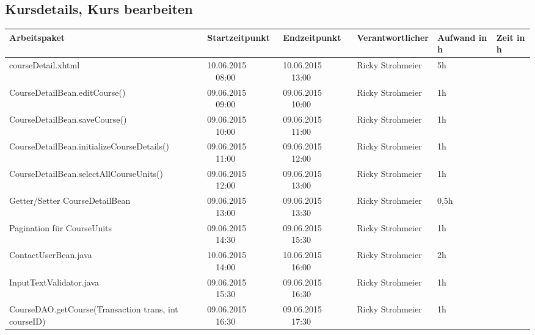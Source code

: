 \begin{landscape}
	\subsection{Kursdetails, Kurs bearbeiten}
	\begin{tabular}{|p{10.3cm}|p{3.2cm}|p{3.2cm}|p{3.5cm}|p{1.7cm}|p{1.5cm}|}
		\hline  \textbf{Arbeitspaket} & \textbf{Startzeitpunkt} & \textbf{Endzeitpunkt} & \textbf{Verantwortlicher}  & \textbf{Aufwand in h} & \textbf{Zeit in h}\\ 
		\hline   courseDetail.xhtml                                         & 10.06.2015 \ \ 08:00       & 10.06.2015  \ \  13:00     & Ricky Strohmeier  &  5h              & \\
		\hline   CourseDetailBean.editCourse()                              & 09.06.2015 \ \ 09:00       & 09.06.2015  \ \  10:00     & Ricky Strohmeier  &  1h              & \\
		\hline   CourseDetailBean.saveCourse()                              & 09.06.2015 \ \ 10:00       & 09.06.2015  \ \  11:00     & Ricky Strohmeier  &  1h              &\\
		\hline   CourseDetailBean.initializeCourseDetails()                 & 09.06.2015 \ \ 11:00       & 09.06.2015  \ \  12:00     & Ricky Strohmeier  &  1h              &\\
		\hline   CourseDetailBean.selectAllCourseUnits()                    & 09.06.2015 \ \ 12:00       & 09.06.2015  \ \  13:00     & Ricky Strohmeier  &  1h              &\\
		\hline   Getter/Setter CourseDetailBean                             & 09.06.2015 \ \ 13:00       & 09.06.2015  \ \  13:30     & Ricky Strohmeier  &  0,5h            &\\
		\hline   Pagination für CourseUnits                                 & 09.06.2015 \ \ 14:30       & 09.06.2015  \ \  15:30     & Ricky Strohmeier  &  1h              &\\
		\hline   ContactUserBean.java                                       & 10.06.2015 \ \ 14:00       & 10.06.2015  \ \  16:00     & Ricky Strohmeier  &  2h              & \\
		\hline   InputTextValidator.java                                    & 09.06.2015 \ \ 15:30       & 09.06.2015  \ \  16:30     & Ricky Strohmeier  &  1h              & \\
		\hline   CourseDAO.getCourse(Transaction trans, int courseID)       & 09.06.2015 \ \ 16:30       & 09.06.2015  \ \  17:30     & Ricky Strohmeier  &  1h              & \\

\end{tabular}
\end{landscape}
